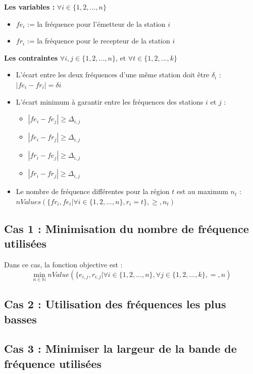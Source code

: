 \documentclass[a4paper, 10pt]{article}
\begin{document}
    \textbf{Les variables : } $\forall i \in \{1,2,...,n \}$
    \begin{itemize}
      \item $fe_{i}$ := la fréquence pour l'émetteur de la station $i$
      \item $fr_{i}$ := la fréquence pour le recepteur de la station $i$
    \end{itemize}

    \textbf{Les contraintes} $\forall i,j \in \{1,2,...,n \}$, et $\forall t \in \{1,2,...,k\}$
    \begin{itemize}
      \item L'écart entre les deux fréquences d'une même station doit être $\delta_{i}$ :
       $| fe_{i} - fr_{i} | = \delta{i}$
      \item L'écart minimum à garantir entre les fréquences des stations $i$ et $j$ :
      \begin{itemize}
        \item $| fe_i - fe_j | \geq \Delta_{i,j}$
        \item $| fe_i - fr_j | \geq \Delta_{i,j}$
        \item $| fr_i - fe_j | \geq \Delta_{i,j}$
        \item $| fr_i - fr_j | \geq \Delta_{i,j}$
      \end{itemize}
      \item Le nombre de fréquence différentes pour la région $t$ est au maximum $n_t$ : $nValues(\{fr_{i}, fe_{i} | \forall i \in \{1,2,...,n \}, r_{i} = t \}, \geq, n_{t})$
    \end{itemize}

    \subsection{Cas 1 : Minimisation du nombre de fréquence utilisées}

      Dans ce cas, la fonction objective est :
      $$ \displaystyle{ \min_{n \in \mathbb{N}}  nValue(\{ e_{i,j}, r_{i,j} | \forall i \in \{1,2,...,n \}, \forall j \in \{1,2,...,k\}, =, n) }$$

    \subsection{Cas 2 : Utilisation des fréquences les plus basses}

    \subsection{Cas 3 : Minimiser la largeur de la bande de fréquence utilisées}
\end{document}
